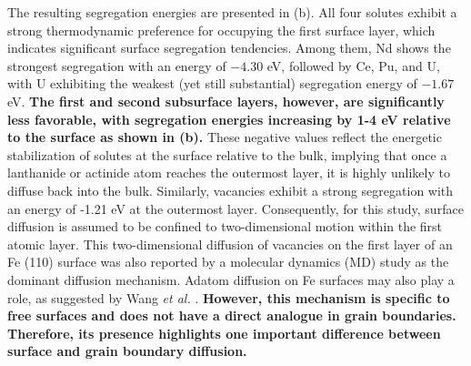 \documentclass[preprint,12pt]{elsarticle}
\providecommand{\DIFaddtex}[1]{{\bf #1}} %
\providecommand{\DIFdeltex}[1]{} %
\providecommand{\DIFaddbegin}{\protect\color{blue}} %
\providecommand{\DIFaddend}{\protect\color{black}} %
\providecommand{\DIFdelbegin}{\protect\color{red}} %
\providecommand{\DIFdelend}{\protect\color{black}} %
\providecommand{\DIFadd}[1]{\texorpdfstring{\DIFaddtex{#1}}{#1}} %
\providecommand{\DIFdel}[1]{\texorpdfstring{\DIFdeltex{#1}}{}} %
\newcommand{\DIFscaledelfig}{0.5}
\newlength{\DIFdelgraphicswidth} %
\newlength{\DIFdelgraphicsheight} %
\newcommand{\DIFaddincludegraphics}[2][]{{\color{blue}\fbox{\DIFOincludegraphics[#1]{#2}}}} %
\newcommand{\DIFdelincludegraphics}[2][]{%
\sbox{\DIFdelgraphicsbox}{\DIFOincludegraphics[#1]{#2}}%
\settoboxwidth{\DIFdelgraphicswidth}{\DIFdelgraphicsbox} %
\settoboxtotalheight{\DIFdelgraphicsheight}{\DIFdelgraphicsbox} %
\scalebox{\DIFscaledelfig}{%
\parbox[b]{\DIFdelgraphicswidth}{\usebox{\DIFdelgraphicsbox}\\[-\baselineskip] \rule{\DIFdelgraphicswidth}{0em}}\llap{\resizebox{\DIFdelgraphicswidth}{\DIFdelgraphicsheight}{%
\setlength{\unitlength}{\DIFdelgraphicswidth}%
\begin{picture}(1,1)%
\thicklines\linethickness{2pt} %
{\color[rgb]{1,0,0}\put(0,0){\framebox(1,1){}}}%
{\color[rgb]{1,0,0}\put(0,0){\line( 1,1){1}}}%
{\color[rgb]{1,0,0}\put(0,1){\line(1,-1){1}}}%
\end{picture}%
}\hspace*{3pt}}} %
} %
\DeclareRobustCommand{\DIFaddbegin}{\DIFOaddbegin \let\includegraphics\DIFaddincludegraphics} %
\DeclareRobustCommand{\DIFaddend}{\DIFOaddend \let\includegraphics\DIFOincludegraphics} %
\DeclareRobustCommand{\DIFdelbegin}{\DIFOdelbegin \let\includegraphics\DIFdelincludegraphics} %
\DeclareRobustCommand{\DIFdelend}{\DIFOaddend \let\includegraphics\DIFOincludegraphics} %
\begin{document}
The resulting segregation energies are presented in (b). All four solutes exhibit a strong thermodynamic preference for occupying the first surface layer, which indicates significant surface segregation tendencies. Among them, Nd shows the strongest segregation with an energy of \( -4.30 \) eV, followed by Ce, Pu, and U, with U exhibiting the weakest (yet still substantial) segregation energy of \( -1.67 \) eV.
\DIFaddbegin \DIFadd{The first and second subsurface layers, however, are significantly less favorable, with segregation energies increasing by 1-4 eV relative to the surface as shown in \Cref{fig:surface_seg}(b). }\DIFaddend These negative values reflect the energetic stabilization of solutes at the surface relative to the bulk, implying that once a lanthanide or actinide atom reaches the \DIFdelbegin \DIFdel{surface, particularly the }\DIFdelend outermost layer, it is highly unlikely to diffuse back into the bulk. Similarly, vacancies exhibit a strong segregation with an energy of -1.21 eV at the outermost layer. Consequently, for this study, surface diffusion is assumed to be confined to two-dimensional motion within the first atomic layer. This two-dimensional diffusion of vacancies on the first layer of an Fe (110) surface was also reported by a molecular dynamics (MD) study \cite{wang2010single} as the dominant diffusion mechanism. Adatom diffusion on Fe surfaces may also play a role, as suggested by Wang \textit{et al.} \cite{wang2012molecular}. \DIFaddbegin \DIFadd{However, this mechanism is specific to free surfaces and does not have a direct analogue in grain boundaries. Therefore, its presence highlights one important difference between surface and grain boundary diffusion.
}\DIFaddend 
\end{document}
